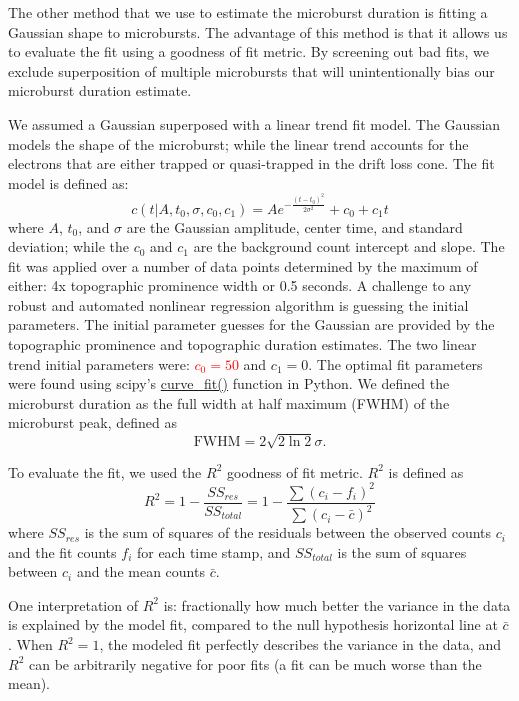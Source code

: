 \documentclass[draft]{agujournal2019}
\begin{document}
The other method that we use to estimate the microburst duration is fitting a Gaussian shape to microbursts. The advantage of this method is that it allows us to evaluate the fit using a goodness of fit metric. By screening out bad fits, we exclude superposition of multiple microbursts that will unintentionally bias our microburst duration estimate.

We assumed a Gaussian superposed with a linear trend fit model. The Gaussian models the shape of the microburst; while the linear trend accounts for the electrons that are either trapped or quasi-trapped in the drift loss cone. The fit model is defined as:
\begin{equation}
c(t | A, t_0, \sigma, c_0, c_1) = A e^{-\frac{(t-t_0)^2}{2\sigma^2}} + c_0 + c_1 t
\end{equation} where $A$, $t_0$, and $\sigma$ are the Gaussian amplitude, center time, and standard deviation; while the $c_0$ and $c_1$ are the background count intercept and slope. The fit was applied over a number of data points determined by the maximum of either: 4x topographic prominence width or 0.5 seconds. A challenge to any robust and automated nonlinear regression algorithm is guessing the initial parameters. The initial parameter guesses for the Gaussian are provided by the topographic prominence and topographic duration estimates. The two linear trend initial parameters were: \textcolor{red}{$c_0=50$} and $c_1=0$. The optimal fit parameters were found using scipy's \url{curve_fit()} function in Python. We defined the microburst duration as the full width at half maximum (FWHM) of the microburst peak, defined as
\begin{equation}
\mathrm{FWHM} = 2\sqrt{2 \ln{2}} \sigma.
\end{equation}

To evaluate the fit, we used the $R^2$ goodness of fit metric. $R^2$ is defined as
\begin{equation}
R^2 = 1 - \frac{SS_{res}}{SS_{total}} = 1 - \frac{\sum{(c_i-f_i)^2}}{\sum{(c_i-\bar{c})^2}}
\end{equation} where $SS_{res}$ is the sum of squares of the residuals between the observed counts $c_i$ and the fit counts $f_i$ for each time stamp, and $SS_{total}$ is the sum of squares between $c_i$ and the mean counts $\bar{c}$.

One interpretation of $R^2$ is: fractionally how much better the variance in the data is explained by the model fit, compared to the null hypothesis horizontal line at $\bar{c}$. When $R^2=1$, the modeled fit perfectly describes the variance in the data, and $R^2$ can be arbitrarily negative for poor fits (a fit can be much worse than the mean).
\end{document}
